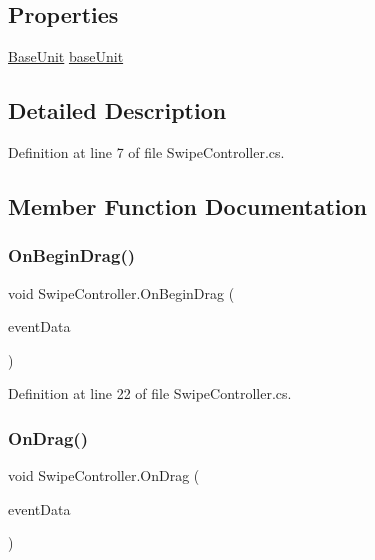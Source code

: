 \subsection*{Properties}
\begin{DoxyCompactItemize}
\item 
\mbox{\hyperlink{class_base_unit}{Base\+Unit}} \mbox{\hyperlink{class_swipe_controller_a422f7e579179be4a1e6e198d97068cc2}{base\+Unit}}
\end{DoxyCompactItemize}


\subsection{Detailed Description}


Definition at line 7 of file Swipe\+Controller.\+cs.



\subsection{Member Function Documentation}
\mbox{\label{class_swipe_controller_a6f7b3f648901c5cc45a9da620ec7ccfa}} 
\subsubsection{\texorpdfstring{OnBeginDrag()}{OnBeginDrag()}}
{\footnotesize\ttfamily void Swipe\+Controller.\+On\+Begin\+Drag (\begin{DoxyParamCaption}\item[{Pointer\+Event\+Data}]{event\+Data }\end{DoxyParamCaption})}



Definition at line 22 of file Swipe\+Controller.\+cs.

\mbox{\label{class_swipe_controller_a5d6462d855ab4cd7496dde16c7eba5f3}} 
\subsubsection{\texorpdfstring{OnDrag()}{OnDrag()}}
{\footnotesize\ttfamily void Swipe\+Controller.\+On\+Drag (\begin{DoxyParamCaption}\item[{Pointer\+Event\+Data}]{event\+Data }\end{DoxyParamCaption})}



